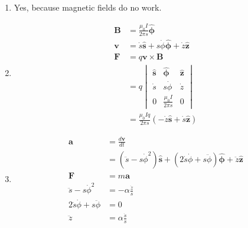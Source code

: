 \documentclass{article}
\renewcommand{\vec}[1]{\boldsymbol{\mathbf{#1}}}
\newcommand{\uvec}[1]{\hat{\vec{#1}}}
\begin{document}
\begin{enumerate}
  \item Yes, because magnetic fields do no work.

  \item

        \begin{align*}
          \vec{B} & = \frac{\mu_0 I}{2 \pi s} \uvec{\phi}                              \\
          \vec{v} & = \dot{s} \uvec{s} + s \dot{\phi} \uvec{\phi} + \dot{z} \uvec{z}   \\
          \vec{F} & = q \vec{v} \times \vec{B}                                         \\
                  & = q \begin{vmatrix}
                          \uvec{s} & \uvec{\phi}             & \uvec{z} \\
                          \dot{s}  & s \dot{\phi}            & \dot{z}  \\
                          0        & \frac{\mu_0 I}{2 \pi s} & 0
                        \end{vmatrix}                  \\
                  & = \frac{\mu_0 I q}{2 \pi s} (-\dot{z} \uvec{s} + \dot{s} \uvec{z})
        \end{align*}

  \item

        \begin{align*}
          \vec{a}                              & = \frac{d \vec{v}}{d t}                                                                                         \\
                                               & = (\ddot{s} - s \dot{\phi}^2) \uvec{s} + (2 \dot{s} \dot{\phi} + s \ddot{\phi}) \uvec{\phi} + \ddot{z} \uvec{z} \\
          \vec{F}                              & = m \vec{a}                                                                                                     \\
          \ddot{s} - s \dot{\phi}^2            & = -\alpha \frac{\dot{z}}{s}                                                                                     \\
          2 \dot{s} \dot{\phi} + s \ddot{\phi} & = 0                                                                                                             \\
          \ddot{z}                             & = \alpha \frac{\dot{s}}{s}
        \end{align*}


\end{enumerate}
\end{document}
